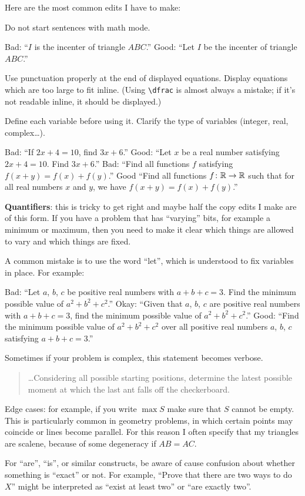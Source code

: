 \documentclass[11pt]{scrartcl}
\theoremstyle{inlined}
\begin{document}
Here are the most common edits I have to make:
\begin{itemize}
   \ii Do not start sentences with math mode.
   \begin{itemize}
      \ii Bad: ``$I$ is the incenter of triangle $ABC$.''
      \ii Good: ``Let $I$ be the incenter of triangle $ABC$.''
   \end{itemize}

   \ii Use punctuation properly at the end of displayed equations.
   Display equations which are too large to fit inline.
   (Using \verb+\dfrac+ is almost always a mistake;
   if it's not readable inline, it should be displayed.)

   \ii Define each variable before using it.
   Clarify the type of variables (integer, real, complex\dots).
   \begin{itemize}
      \ii Bad: ``If $2x+4 = 10$, find $3x+6$.''
      \ii Good: ``Let $x$ be a real number satisfying $2x+4=10$. Find $3x+6$.''
      \ii Bad: ``Find all functions $f$ satisfying $f(x+y)=f(x)+f(y)$.''
      \ii Good ``Find all functions $f \colon \mathbb R \to \mathbb R$
      such that for all real numbers $x$ and $y$,
      we have $f(x+y)=f(x)+f(y)$.''
   \end{itemize}

   \ii \textbf{Quantifiers}: this is tricky to get right
   and maybe half the copy edits I make are of this form.
   If you have a problem that has ``varying'' bits,
   for example a minimum or maximum, then you need to make it clear
   which things are allowed to vary and which things are fixed.

   A common mistake is to use the word ``let'',
   which is understood to fix variables in place.
   For example:
   \begin{itemize}
      \ii Bad: ``Let $a$, $b$, $c$ be positive real numbers with $a+b+c=3$.
      Find the minimum possible value of $a^2+b^2+c^2$.''
      \ii Okay: ``Given that $a$, $b$, $c$ are positive real numbers with $a+b+c=3$,
      find the minimum possible value of $a^2+b^2+c^2$.''
      \ii Good: ``Find the minimum possible value of $a^2+b^2+c^2$
      over all positive real numbers $a$, $b$, $c$ satisfying $a+b+c=3$.''
   \end{itemize}
   Sometimes if your problem is complex, this statement becomes verbose.
   \begin{quote}
      \dots Considering all possible starting positions,
      determine the latest possible moment at which the last ant falls off the checkerboard.
   \end{quote}

   \ii Edge cases:
   for example, if you write $\max S$ make sure that $S$ cannot be empty.
   This is particularly common in geometry problems,
   in which certain points may coincide or lines become parallel.
   For this reason I often specify that my triangles are scalene,
   because of some degeneracy if $AB=AC$.

   \ii For ``are'', ``is'', or similar constructs,
   be aware of cause confusion about whether something is ``exact'' or not.
   For example, ``Prove that there are two ways to do $X$''
   might be interpreted as ``exist at least two''
   or ``are exactly two''.
\end{itemize}
\end{document}
